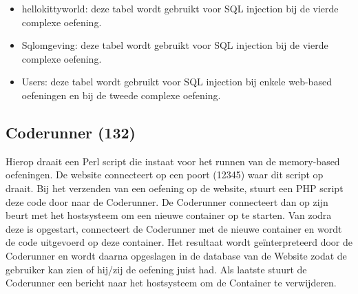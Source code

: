 	\begin{itemize}
	\item hellokittyworld: deze tabel wordt gebruikt voor SQL injection bij de vierde complexe oefening.
	\item Sqlomgeving: deze tabel wordt gebruikt voor SQL injection bij de vierde complexe oefening.
	\item Users: deze tabel wordt gebruikt voor SQL injection bij enkele web-based oefeningen en bij de tweede complexe oefening.
	\end{itemize}


\subsection{Coderunner (132)}
Hierop draait een Perl script die instaat voor het runnen van de memory-based oefeningen. De website connecteert op een poort (12345) waar dit script op draait. Bij het verzenden van een oefening op de website, stuurt een PHP script deze code door naar de Coderunner. De Coderunner connecteert dan op zijn beurt met het hostsysteem om een nieuwe container op te starten. Van zodra deze is opgestart, connecteert de Coderunner met de nieuwe container en wordt de code uitgevoerd op deze container. Het resultaat wordt ge\"interpreteerd door de Coderunner en wordt daarna opgeslagen in de database van de Website zodat de gebruiker kan zien of hij/zij de oefening juist had. Als laatste stuurt de Coderunner een bericht naar het hostsysteem om de Container te verwijderen.
